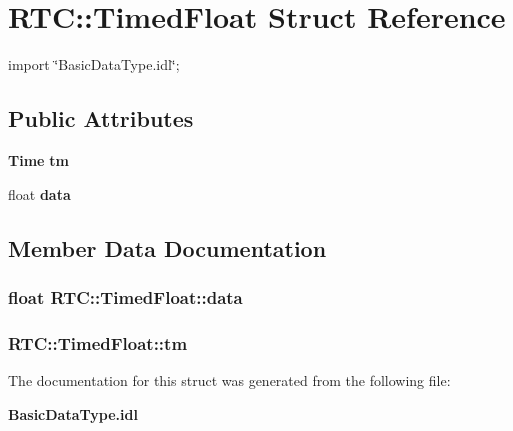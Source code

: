 \section{RTC::TimedFloat Struct Reference}
\label{structRTC_1_1TimedFloat}


{\ttfamily import \char`\"{}BasicDataType.idl\char`\"{};}

\subsection*{Public Attributes}
\begin{DoxyCompactItemize}
\item 
{\bf Time} {\bf tm}
\item 
float {\bf data}
\end{DoxyCompactItemize}


\subsection{Member Data Documentation}
\subsubsection[{data}]{\setlength{\rightskip}{0pt plus 5cm}float {\bf RTC::TimedFloat::data}}\label{structRTC_1_1TimedFloat_ac071c97d322eda23f48c0f60d33fce28}
\subsubsection[{tm}]{ {\bf RTC::TimedFloat::tm}}\label{structRTC_1_1TimedFloat_afc52cd219182bd89ac8e76515db1aaea}


The documentation for this struct was generated from the following file:\begin{DoxyCompactItemize}
\item 
{\bf BasicDataType.idl}\end{DoxyCompactItemize}
